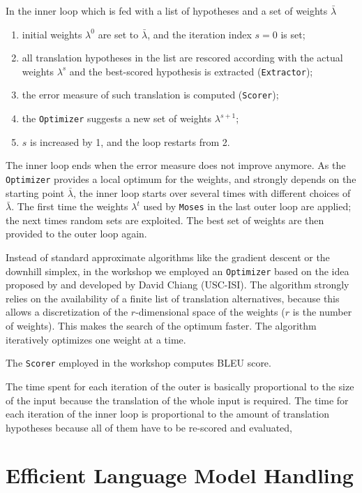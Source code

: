 \documentclass[10pt]{report}
\theoremstyle{plain}
\begin{document}
{In the inner loop which  is fed with a list of hypotheses and a set of weights $\bar \lambda$
\begin{enumerate}
\item initial weights $\lambda^0$ are set to $\bar \lambda$, and the iteration index $s=0$ is set;
\item all translation hypotheses in the list are rescored according with the actual weights $\lambda^s$
and the best-scored hypothesis is extracted ({\tt Extractor});
\item the error measure of such translation is computed ({\tt Scorer});
\item the {\tt Optimizer} suggests a new set of weights $\lambda^{s+1}$;
\item $s$ is increased by 1, and the loop restarts from 2.
\end{enumerate}
The inner loop ends when the error measure does not improve anymore.
As the {\tt Optimizer} provides a local optimum for the weights, and strongly depends on the starting point $\bar \lambda$, the inner loop starts over several  times with different choices of $\bar \lambda$. The first time the weights $\lambda^t$ used by {\tt Moses} in the last outer loop are applied; the next times random sets are exploited. The best set of weights are then provided to the outer loop again.

Instead of standard approximate algorithms like the gradient descent or the downhill simplex, in the workshop we employed an {\tt Optimizer} based on the idea proposed by \cite{och:03} and developed by David Chiang (USC-ISI). The algorithm strongly relies on the availability of a finite list of translation alternatives, because this allows a discretization of the $r$-dimensional space of the weights ($r$ is the number of weights). This makes the search of the optimum  faster. The algorithm iteratively optimizes one weight at a time.

The {\tt Scorer} employed in the workshop computes BLEU score.

The time spent for each iteration of the outer is basically proportional to the size of the input  because the translation of the whole input is required. The time for each iteration of the inner loop is proportional to the amount of translation hypotheses because all of them have to be re-scored and evaluated,



\section{Efficient Language Model Handling}

}
\end{document}
